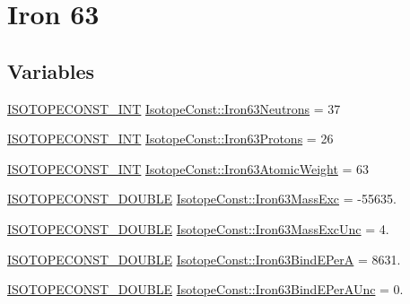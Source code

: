 \hypertarget{group___isotope_const-_iron-_fe63}{}\section{Iron 63}
\label{group___isotope_const-_iron-_fe63}
\subsection*{Variables}
\begin{DoxyCompactItemize}
\item 
\mbox{\hyperlink{group___isotope_const-_macros_ga5f18360b3e99483a35c32d789e62621c}{I\+S\+O\+T\+O\+P\+E\+C\+O\+N\+S\+T\+\_\+\+I\+NT}} \mbox{\hyperlink{group___isotope_const-_iron-_fe63_ga6760a1c9f4dc33ab5681b24876df3de9}{Isotope\+Const\+::\+Iron63\+Neutrons}} = 37
\item 
\mbox{\hyperlink{group___isotope_const-_macros_ga5f18360b3e99483a35c32d789e62621c}{I\+S\+O\+T\+O\+P\+E\+C\+O\+N\+S\+T\+\_\+\+I\+NT}} \mbox{\hyperlink{group___isotope_const-_iron-_fe63_ga1bc17e652fd82818cdadd39172f7f34d}{Isotope\+Const\+::\+Iron63\+Protons}} = 26
\item 
\mbox{\hyperlink{group___isotope_const-_macros_ga5f18360b3e99483a35c32d789e62621c}{I\+S\+O\+T\+O\+P\+E\+C\+O\+N\+S\+T\+\_\+\+I\+NT}} \mbox{\hyperlink{group___isotope_const-_iron-_fe63_gafc00c7f585c0c17784de25eb113bd5c8}{Isotope\+Const\+::\+Iron63\+Atomic\+Weight}} = 63
\item 
\mbox{\hyperlink{group___isotope_const-_macros_ga8f45a7272ce02c0b4c65c44636ed719a}{I\+S\+O\+T\+O\+P\+E\+C\+O\+N\+S\+T\+\_\+\+D\+O\+U\+B\+LE}} \mbox{\hyperlink{group___isotope_const-_iron-_fe63_gaac9e1eaa4a95329325c87a33a1964120}{Isotope\+Const\+::\+Iron63\+Mass\+Exc}} = -\/55635.
\item 
\mbox{\hyperlink{group___isotope_const-_macros_ga8f45a7272ce02c0b4c65c44636ed719a}{I\+S\+O\+T\+O\+P\+E\+C\+O\+N\+S\+T\+\_\+\+D\+O\+U\+B\+LE}} \mbox{\hyperlink{group___isotope_const-_iron-_fe63_ga8e505e19d66a17f2e0b6064314b18543}{Isotope\+Const\+::\+Iron63\+Mass\+Exc\+Unc}} = 4.
\item 
\mbox{\hyperlink{group___isotope_const-_macros_ga8f45a7272ce02c0b4c65c44636ed719a}{I\+S\+O\+T\+O\+P\+E\+C\+O\+N\+S\+T\+\_\+\+D\+O\+U\+B\+LE}} \mbox{\hyperlink{group___isotope_const-_iron-_fe63_gae16f8bf37221300c5a287aef77109f01}{Isotope\+Const\+::\+Iron63\+Bind\+E\+PerA}} = 8631.
\item 
\mbox{\hyperlink{group___isotope_const-_macros_ga8f45a7272ce02c0b4c65c44636ed719a}{I\+S\+O\+T\+O\+P\+E\+C\+O\+N\+S\+T\+\_\+\+D\+O\+U\+B\+LE}} \mbox{\hyperlink{group___isotope_const-_iron-_fe63_ga76d1efb0a38e7d5c40398eb280d9e774}{Isotope\+Const\+::\+Iron63\+Bind\+E\+Per\+A\+Unc}} = 0.

\end{DoxyCompactItemize}

